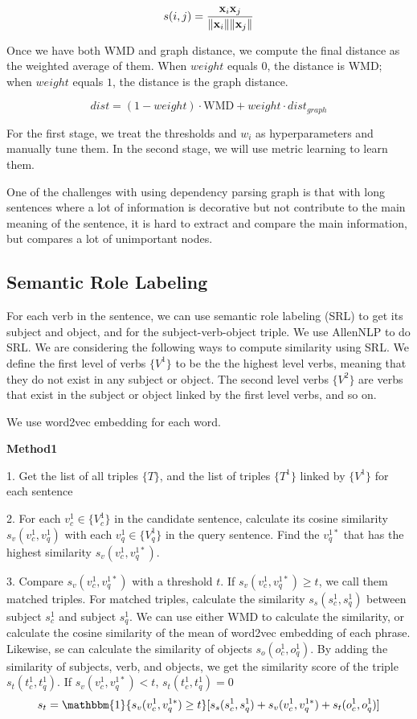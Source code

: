 \documentclass[letterpaper]{article}
\begin{document}
\begin{equation}
	s(i, j)=\frac{\mathbf{x}_i\mathbf{x}_j}{\|\mathbf{x}_i\|\|\mathbf{x}_j\|}
\end{equation}

Once we have both WMD and graph distance, we compute the final distance as the weighted average of them. When $weight$ equals $0$, the distance is WMD; when $weight$ equals $1$, the distance is the graph distance.

\begin{equation}
	dist= (1-weight)\cdot \textrm{WMD} + weight \cdot dist_{graph} 
\end{equation}

For the first stage, we treat the thresholds and $w_i$ as hyperparameters and manually tune them. In the second stage, we will use metric learning to learn them.

One of the challenges with using dependency parsing graph is that with long sentences where a lot of information is decorative but not contribute to the main meaning of the sentence, it is hard to extract and compare the main information, but compares a lot of unimportant nodes.

\subsection{Semantic Role Labeling}
For each verb in the sentence, we can use semantic role labeling (SRL) to get its subject and object, and for the subject-verb-object triple. We use AllenNLP to do SRL. We are considering the following ways to compute similarity using SRL. We define the first level of verbs $\{V^1\}$ to be the the highest level verbs, meaning that they do not exist in any subject or object. The second level verbs $\{V^2\}$ are verbs that exist in the subject or object linked by the first level verbs, and so on.

We use word2vec embedding for each word.

\textbf{Method1}

1. Get the list of all triples $\{T\}$, and the list of triples $\{T^1\}$ linked by $\{V^1\}$ for each sentence

2. For each $v_{c}^1 \in \{V_{c}^1\}$ in the candidate sentence, calculate its cosine similarity $s_v(v_c^1, v_q^1)$ with each $v_{q}^1 \in \{V_{q}^1\}$ in the query sentence. Find the $v_{q}^{1*}$ that has the highest similarity $s_v(v_c^1, v_q^{1*})$. 

3. Compare $s_v(v_c^1, v_q^{1*})$ with a threshold $t$. If $s_v(v_c^1, v_q^{1*}) \geq t$, we call them matched triples. For matched triples, calculate the similarity $s_s(s_c^1, s_q^1)$ between subject $s_c^1$ and subject $s_q^1$. We  can use either WMD to calculate the similarity, or calculate the cosine similarity of the mean of word2vec embedding of each phrase. Likewise, se can calculate the similarity of objects $s_o(o_c^1, o_q^1)$. By adding the similarity of subjects, verb, and objects, we get the similarity score of the triple $s_t(t_c^1, t_q^1)$. If  $s_v(v_c^1, v_q^{1*}) < t$, $s_t(t_c^1, t_q^1)=0$
\begin{align}
s_t = \mathbbm{1} \{s_v(v_c^1, v_q^{1*}) \geq t\}[s_s(s_c^1, s_q^1)+s_v(v_c^1, v_q^{1*})+s_t(o_c^1, o_q^1)]
\end{align}
\end{document}
